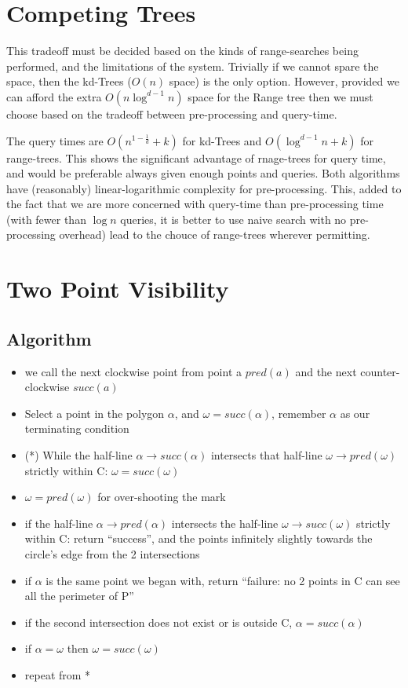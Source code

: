 \section {Competing Trees}

This tradeoff must be decided based on the kinds of range-searches being performed, and the limitations of the system.
Trivially if we cannot spare the space, then the kd-Trees ($O(n)$ space) is the only option.
However, provided we can afford the extra $O(n\log^{d-1}n)$ space for the Range tree then we must choose based on the tradeoff between pre-processing and query-time.

The query times are $O(n^{1-\frac{1}{d}} + k)$ for kd-Trees and $O(\log^{d-1}n+k)$ for range-trees.
This shows the significant advantage of rnage-trees for query time, and would be preferable always given enough points and queries.
Both algorithms have (reasonably) linear-logarithmic complexity for pre-processing.
This, added to the fact that we are more concerned with query-time than pre-processing time (with fewer than $\log n$ queries, it is better to use naive search with no pre-processing overhead) lead to the chouce of range-trees wherever permitting.

\section {Two Point Visibility}

\subsection{Algorithm}

\begin{itemize}
\itemsep0em
	\item we call the next clockwise point from point a $pred(a)$ and the next counter-clockwise $succ(a)$
	\item Select a point in the polygon $\alpha$, and $\omega = succ(\alpha)$, remember $\alpha$ as our terminating condition
	\item (*) While the half-line $\alpha \rightarrow succ(\alpha)$ intersects that half-line $\omega \rightarrow pred(\omega)$ strictly within C: $\omega = succ(\omega)$
	\item $\omega = pred(\omega)$ for over-shooting the mark
	\item if the half-line $\alpha \rightarrow pred(\alpha)$ intersects the half-line $\omega \rightarrow succ(\omega)$ strictly within C: return ``success'', and the points infinitely slightly towards the circle's edge from the 2 intersections
	\item if $\alpha$ is the same point we began with, return ``failure: no 2 points in C can see all the perimeter of P''
	\item if the second intersection does not exist or is outside C, $\alpha = succ(\alpha)$
	\item if $\alpha = \omega$ then $\omega = succ(\omega)$
	\item repeat from *
\end{itemize}

